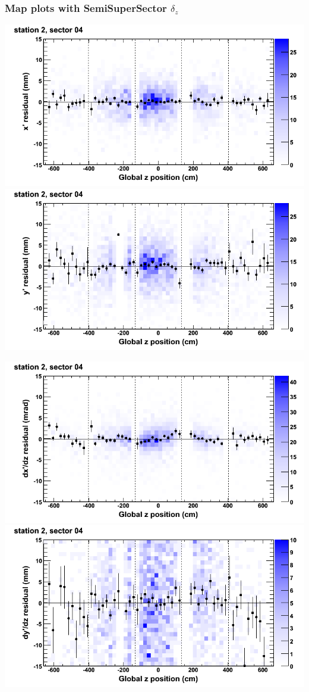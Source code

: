 \documentclass[compress]{beamer}
\begin{document}
\begin{frame}
\frametitle{Map plots with SemiSuperSector $\delta_z$}
\includegraphics[width=0.5\linewidth]{zfit_mapplots/DTvsz_st2sec04_x.png}
\includegraphics[width=0.5\linewidth]{zfit_mapplots/DTvsz_st2sec04_y.png}

\includegraphics[width=0.5\linewidth]{zfit_mapplots/DTvsz_st2sec04_dxdz.png}
\includegraphics[width=0.5\linewidth]{zfit_mapplots/DTvsz_st2sec04_dydz.png}
\end{frame}
\end{document}

